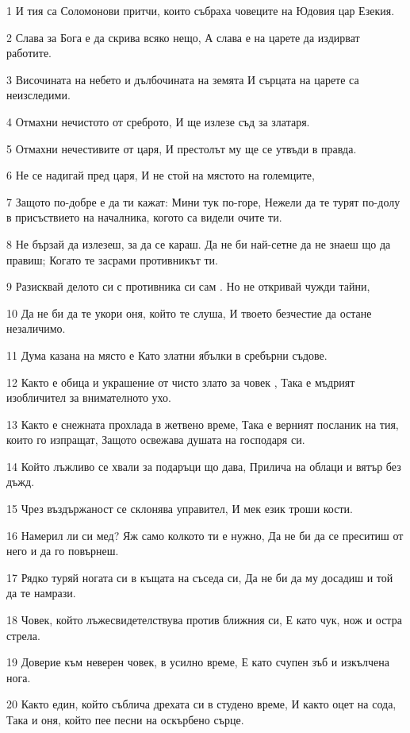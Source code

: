 \par 1 И тия са Соломонови притчи, които събраха човеците на Юдовия цар Езекия.
\par 2 Слава за Бога е да скрива всяко нещо, А слава е на царете да издирват работите.
\par 3 Височината на небето и дълбочината на земята И сърцата на царете са неизследими.
\par 4 Отмахни нечистото от среброто, И ще излезе съд за златаря.
\par 5 Отмахни нечестивите от царя, И престолът му ще се утвъди в правда.
\par 6 Не се надигай пред царя, И не стой на мястото на големците,
\par 7 Защото по-добре е да ти кажат: Мини тук по-горе, Нежели да те турят по-долу в присъствието на началника, когото са видели очите ти.
\par 8 Не бързай да излезеш, за да се караш. Да не би най-сетне да не знаеш що да правиш; Когато те засрами противникът ти.
\par 9 Разисквай делото си с противника си сам . Но не откривай чужди тайни,
\par 10 Да не би да те укори оня, който те слуша, И твоето безчестие да остане незаличимо.
\par 11 Дума казана на място е Като златни ябълки в сребърни съдове.
\par 12 Както е обица и украшение от чисто злато за човек , Така е мъдрият изобличител за внимателното ухо.
\par 13 Както е снежната прохлада в жетвено време, Така е верният посланик на тия, които го изпращат, Защото освежава душата на господаря си.
\par 14 Който лъжливо се хвали за подаръци що дава, Прилича на облаци и вятър без дъжд.
\par 15 Чрез въздържаност се склонява управител, И мек език троши кости.
\par 16 Намерил ли си мед? Яж само колкото ти е нужно, Да не би да се преситиш от него и да го повърнеш.
\par 17 Рядко туряй ногата си в къщата на съседа си, Да не би да му досадиш и той да те намрази.
\par 18 Човек, който лъжесвидетелствува против ближния си, Е като чук, нож и остра стрела.
\par 19 Доверие към неверен човек, в усилно време, Е като счупен зъб и изкълчена нога.
\par 20 Както един, който съблича дрехата си в студено време, И както оцет на сода, Така и оня, който пее песни на оскърбено сърце.
